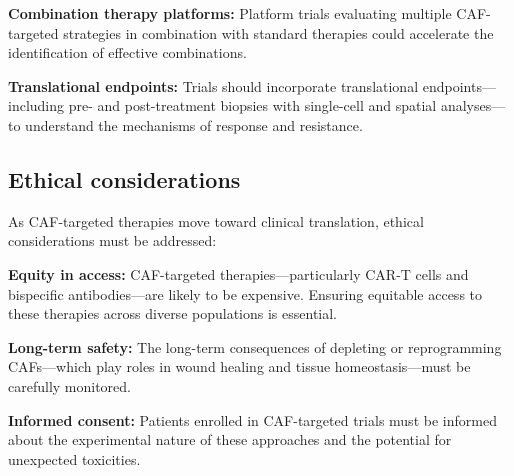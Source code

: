 \textbf{Combination therapy platforms:} Platform trials evaluating multiple CAF-targeted strategies in combination with standard therapies could accelerate the identification of effective combinations.

\textbf{Translational endpoints:} Trials should incorporate translational endpoints---including pre- and post-treatment biopsies with single-cell and spatial analyses---to understand the mechanisms of response and resistance.

\subsection{Ethical considerations}

As CAF-targeted therapies move toward clinical translation, ethical considerations must be addressed:

\textbf{Equity in access:} CAF-targeted therapies---particularly CAR-T cells and bispecific antibodies---are likely to be expensive. Ensuring equitable access to these therapies across diverse populations is essential.

\textbf{Long-term safety:} The long-term consequences of depleting or reprogramming CAFs---which play roles in wound healing and tissue homeostasis---must be carefully monitored.

\textbf{Informed consent:} Patients enrolled in CAF-targeted trials must be informed about the experimental nature of these approaches and the potential for unexpected toxicities.
